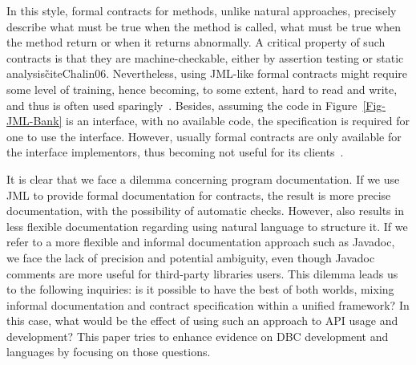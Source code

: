 In this style, formal contracts for methods, unlike natural approaches, precisely describe what must be true when the method is called, what must be true when the method return or when it returns abnormally. A critical property of such contracts is that they are machine-checkable, either by assertion testing or static analysis\~cite{Chalin06}.
Nevertheless, using JML-like formal contracts might require some level of training, hence becoming, to some extent, hard to read and write, and thus is often used sparingly~\cite{Chalin06,Polikarpova-etal09,typeContracts}.
Besides, assuming the code in Figure~\ref{Fig-JML-Bank} is an interface, with no available code, the specification is required for one to use the interface. However, usually formal contracts are only available for the interface implementors, thus becoming not useful for its clients~\cite{Parnas2011}.


It is clear that we face a dilemma concerning program documentation. If we use JML to provide formal documentation for contracts, the result is more precise documentation, with the possibility of automatic checks. However, also results in less flexible documentation regarding using natural language to structure it.
If we refer to a more flexible and informal documentation approach such as Javadoc, we face the lack of precision and potential ambiguity, even though Javadoc comments are more useful for third-party libraries users. This dilemma leads us to the following inquiries: is it possible to have the best of both worlds, mixing informal documentation and contract specification within a unified framework? In this case, what would be the effect of using such an approach to API usage and development? This paper tries to enhance evidence on DBC development and languages by focusing on those questions.

